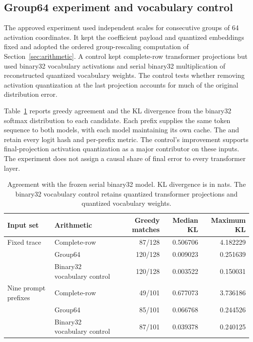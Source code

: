\subsection{Group64 experiment and vocabulary control}

The approved experiment used independent scales for consecutive groups of 64 activation coordinates.  It kept the coefficient payload and quantized embeddings fixed and adopted the ordered group-rescaling computation of Section~\ref{sec:arithmetic}.  A control kept complete-row transformer projections but used binary32 vocabulary activations and serial binary32 multiplication of reconstructed quantized vocabulary weights.  The control tests whether removing activation quantization at the last projection accounts for much of the original distribution error.

Table~\ref{tab:accuracy} reports greedy agreement and the KL divergence from the binary32 softmax distribution to each candidate.  Each prefix supplies the same token sequence to both models, with each model maintaining its own cache.  The  and  retain every logit hash and per-prefix metric.  The control's improvement supports final-projection activation quantization as a major contributor on these inputs.  The experiment does not assign a causal share of final error to every transformer layer.

\begin{table}[ht]
\centering
\small
\begin{tabular}{llrrr}
\toprule
Input set & Arithmetic & Greedy matches & Median KL & Maximum KL\\
\midrule
Fixed trace & Complete-row & 87/128 & 0.506706 & 4.182229\\
 & Group64 & 120/128 & 0.009023 & 0.251639\\
 & Binary32 vocabulary control & 120/128 & 0.003522 & 0.150031\\
\midrule
Nine prompt prefixes & Complete-row & 49/101 & 0.677073 & 3.736186\\
 & Group64 & 85/101 & 0.066768 & 0.244526\\
 & Binary32 vocabulary control & 87/101 & 0.039378 & 0.240125\\
\bottomrule
\end{tabular}
\caption{Agreement with the frozen serial binary32 model.  KL divergence is in nats.  The binary32 vocabulary control retains quantized transformer projections and quantized vocabulary weights.}
\label{tab:accuracy}
\end{table}

